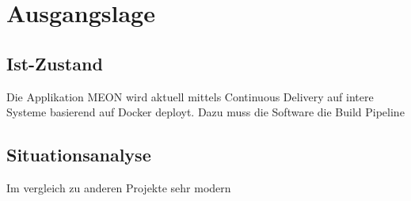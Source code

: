 \chapter{Ausgangslage}

\section{Ist-Zustand}

Die Applikation MEON wird aktuell mittels Continuous Delivery auf intere Systeme basierend auf Docker deployt. Dazu muss die Software die Build Pipeline


\section{Situationsanalyse}

Im vergleich zu anderen Projekte sehr modern